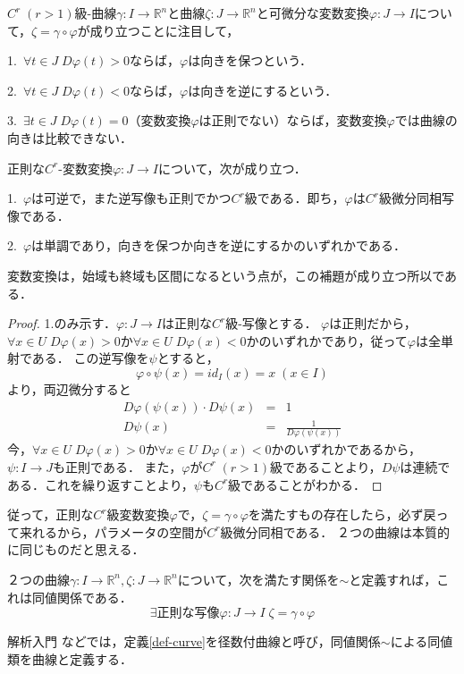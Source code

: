 \documentclass[uplatex, 12pt, dvipdfmx]{jsarticle}
\begin{document}
\begin{definition}\rm{}
    $C^r\;(r>1)$級-曲線$\gamma:I\to\mathbb{R}^n$と曲線$\zeta:J\to\mathbb{R}^n$と可微分な変数変換$\varphi:J\to I$について，$\zeta =\gamma\circ\varphi$が成り立つことに注目して，

    1.\, $\forall t\in J\; D\varphi(t)>0$ならば，$\varphi$は向きを保つという．

    2.\, $\forall t\in J\; D\varphi(t)<0$ならば，$\varphi$は向きを逆にするという．

    3.\, $\exists t\in J\; D\varphi(t)=0$（変数変換$\varphi$は正則でない）ならば，変数変換$\varphi$では曲線の向きは比較できない．
\end{definition}

\begin{proposition}[正則な変数変換]\rm{}\label{prop-regularity-of-transformations-of-parameters}
    正則な$C^r$-変数変換$\varphi:J\to I$について，次が成り立つ．

    1.\, $\varphi$は可逆で，また逆写像も正則でかつ$C^r$級である．即ち，$\varphi$は$C^r$級微分同相写像である．

    2.\, $\varphi$は単調であり，向きを保つか向きを逆にするかのいずれかである．
\end{proposition}
変数変換は，始域も終域も区間になるという点が，この補題が成り立つ所以である．
\begin{proof}
    1.のみ示す．$\varphi:J\to I$は正則な$C^r$級-写像とする．
    $\varphi$は正則だから，$\forall x\in U\; D\varphi(x)>0$か$\forall x\in U\; D\varphi(x)<0$かのいずれかであり，従って$\varphi$は全単射である．
    この逆写像を$\psi$とすると，
    \[ \varphi\circ\psi(x)=id_I(x)=x\;(x\in I) \]
    より，両辺微分すると
    \begin{eqnarray*}
        D\varphi(\psi(x))\cdot D\psi(x)&=&1 \\
        D\psi(x)&=&\frac{1}{D\varphi(\psi(x))}
    \end{eqnarray*}
    今，$\forall x\in U\; D\varphi(x)>0$か$\forall x\in U\; D\varphi(x)<0$かのいずれかであるから，$\psi:I\to J$も正則である．
    また，$\varphi$が$C^r\;(r>1)$級であることより，$D\psi$は連続である．これを繰り返すことより，$\psi$も$C^r$級であることがわかる．
\end{proof}


従って，正則な$C^r$級変数変換$\varphi$で，$\zeta=\gamma\circ\varphi$を満たすもの存在したら，必ず戻って来れるから，パラメータの空間が$C^r$級微分同相である．
２つの曲線は本質的に同じものだと思える．
\begin{corollary}
    ２つの曲線$\gamma:I\to\mathbb{R}^n,\zeta:J\to\mathbb{R}^n$について，次を満たす関係を$\sim$と定義すれば，これは同値関係である．
    \[ \exists 正則な写像\varphi:J\to I　\; \zeta =\gamma\circ\varphi \]
\end{corollary}
\begin{remark}
    解析入門 \cite{解析入門}などでは，定義\ref{def-curve}を径数付曲線と呼び，同値関係$\sim$による同値類を曲線と定義する．
\end{remark}
\end{document}
